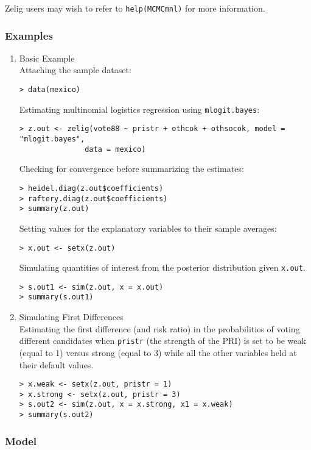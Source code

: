 Zelig users may wish to refer to \texttt{help(MCMCmnl)} for more 
information.



\subsubsection{Examples}

\begin{enumerate}
\item {Basic Example} \\
Attaching the sample dataset:
\begin{verbatim}
> data(mexico)
\end{verbatim}
Estimating multinomial logistics regression using \texttt{mlogit.bayes}:
\begin{verbatim}
> z.out <- zelig(vote88 ~ pristr + othcok + othsocok, model = "mlogit.bayes", 
               data = mexico)
\end{verbatim}
Checking for convergence before summarizing the estimates:
\begin{verbatim}
> heidel.diag(z.out$coefficients)
> raftery.diag(z.out$coefficients)
> summary(z.out)
\end{verbatim} %
Setting values for the explanatory variables to their sample averages:
\begin{verbatim}
> x.out <- setx(z.out)
\end{verbatim}
Simulating quantities of interest from the posterior distribution
given \texttt{x.out}.
\begin{verbatim}
> s.out1 <- sim(z.out, x = x.out)
> summary(s.out1)
\end{verbatim}
\item {Simulating First Differences} \\
Estimating the first difference (and risk ratio) in the probabilities of
voting different candidates when \texttt{pristr} (the strength of the
PRI) is set to be weak (equal to 1) versus strong (equal to 3)
while all the other variables held at their default values.

\begin{verbatim}
> x.weak <- setx(z.out, pristr = 1)
> x.strong <- setx(z.out, pristr = 3)
> s.out2 <- sim(z.out, x = x.strong, x1 = x.weak)
> summary(s.out2)
\end{verbatim}
\end{enumerate}

\subsubsection{Model}

